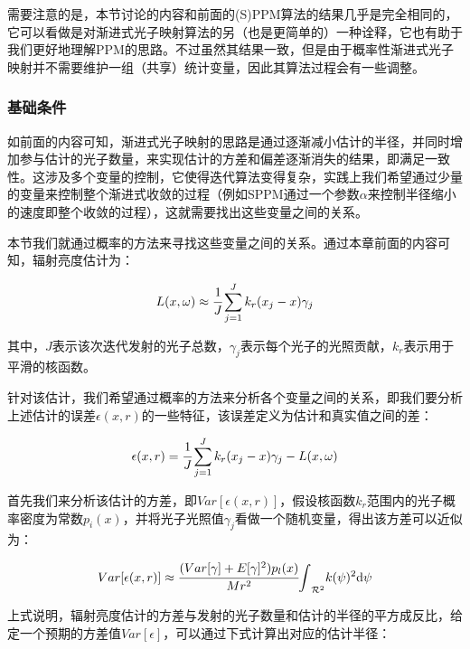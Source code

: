 需要注意的是，本节讨论的内容和前面的(S)PPM算法的结果几乎是完全相同的，它可以看做是对渐进式光子映射算法的另（也是更简单的）一种诠释，它也有助于我们更好地理解PPM的思路。不过虽然其结果一致，但是由于概率性渐进式光子映射并不需要维护一组（共享）统计变量，因此其算法过程会有一些调整。




\subsubsection{基础条件}\label{sec:pm-ppm-basis}
如前面的内容可知，渐进式光子映射的思路是通过逐渐减小估计的半径，并同时增加参与估计的光子数量，来实现估计的方差和偏差逐渐消失的结果，即满足一致性。这涉及多个变量的控制，它使得迭代算法变得复杂，实践上我们希望通过少量的变量来控制整个渐进式收敛的过程（例如SPPM通过一个参数$\alpha$来控制半径缩小的速度即整个收敛的过程），这就需要找出这些变量之间的关系。

本节我们就通过概率的方法来寻找这些变量之间的关系。通过本章前面的内容可知，辐射亮度估计为：

\begin{equation}\label{e:pm-pixel-value} %
	L(x,\omega)\approx \cfrac{1}{J}\sum^{J}_{j=1}k_r(x_j-x)\gamma_j
\end{equation}

\noindent 其中，$J$表示该次迭代发射的光子总数，$\gamma_j$表示每个光子的光照贡献，$k_r$表示用于平滑的核函数。

针对该估计，我们希望通过概率的方法来分析各个变量之间的关系，即我们要分析上述估计的误差$\epsilon(x,r)$的一些特征，该误差定义为估计和真实值之间的差：

\begin{equation}\label{e:pm-ppm-error}
	\epsilon(x,r)= \cfrac{1}{J}\sum^{J}_{j=1}k_r(x_j-x)\gamma_j-L(x,\omega)
\end{equation}

首先我们来分析该估计的方差，即$Var[\epsilon (x,r)]$，假设核函数$k_r$范围内的光子概率密度为常数$p_i(x)$，并将光子光照值$\gamma_j$看做一个随机变量，\cite{a:ProgressivePhotonMappingAProbabilisticApproach}得出该方差可以近似为：

\begin{equation}
	Var[\epsilon(x,r)]\approx \cfrac{(Var[\gamma]+E[\gamma]^{2})p_l(x)}{Mr^{2}}{\rm \int}_{\mathcal{R}^{2}}k(\psi)^{2}{\rm d}\psi
\end{equation}

上式说明，辐射亮度估计的方差与发射的光子数量和估计的半径的平方成反比，给定一个预期的方差值$Var[\epsilon]$，可以通过下式计算出对应的估计半径：

